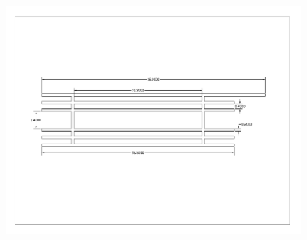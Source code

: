 \begin{figure}[h!]
	\centering
	\includegraphics[width=0.9\linewidth]{figures/dms/electrode.pdf}
\end{figure}
